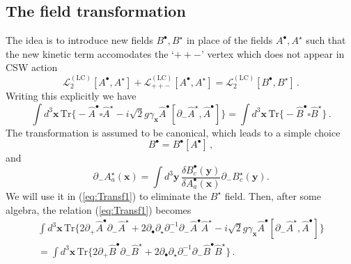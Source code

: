 \documentclass[english,american]{article}
\begin{document}
\subsection{The field transformation}

The idea is to introduce new fields $B^{\bullet},B^{\star}$ in place
of the fields $A^{\bullet},A^{\star}$ such that the new kinetic term accomodates the `$++-$' vertex which does not appear in CSW action \citep{Mansfield2006}
\begin{equation}
\mathcal{L}_{2}^{\left(\mathrm{LC}\right)}\left[A^{\bullet},A^{\star}\right]+\mathcal{L}_{++-}^{\left(\mathrm{LC}\right)}\left[A^{\bullet},A^{\star}\right]=\mathcal{L}_{2}^{\left(\mathrm{LC}\right)}\left[B^{\bullet},B^{\star}\right]\,.
\end{equation}
Writing this explicitly we have
\begin{equation}
\int d^{3}\mathbf{x}\,\mathrm{Tr}\Bigg\{-\hat{A}^{\bullet}\square\hat{A}^{\star}-i\sqrt{2}g\gamma_{\mathbf{x}}\hat{A}^{\bullet}\left[\partial_{-}\hat{A}^{\star},\hat{A}^{\bullet}\right]\Bigg\}=\int d^{3}\mathbf{x}\,\mathrm{Tr}\Bigg\{-\hat{B}^{\bullet}\square\hat{B}^{\star}\Bigg\}\,.\label{eq:Transf1}
\end{equation}
The transformation is assumed to be canonical, which leads to a simple
choice
\begin{equation}
B^{\bullet}=B^{\bullet}\left[A^{\bullet}\right]\,,
\end{equation}
and
\begin{equation}
\partial_{-}A_{a}^{\star}\left(\mathbf{x}\right)=\int d^{3}\mathbf{y}\,\frac{\delta B_{c}^{\bullet}\left(\mathbf{y}\right)}{\delta A_{a}^{\bullet}\left(\mathbf{x}\right)}\partial_{-}B_{c}^{\star}\left(\mathbf{y}\right).\label{eq:Bmindef-2-1}
\end{equation}
We will use it in (\ref{eq:Transf1}) to eliminate the $B^{\star}$
field. Then,  after some algebra, the relation (\ref{eq:Transf1})  becomes
\begin{multline}
\int d^{3}\mathbf{x}\,\mathrm{Tr}\Bigg\{2\partial_{+}\hat{A}^{\bullet}\partial_{-}\hat{A}^{\star}+2\partial_{\bullet}\partial_{\star}\partial_{-}^{-1}\partial_{-}\hat{A}^{\bullet}\hat{A}^{\star}-i\sqrt{2}g\gamma_{\mathbf{x}}\hat{A}^{\bullet}\left[\partial_{-}\hat{A}^{\star},\hat{A}^{\bullet}\right]\Bigg\}\\
=\int d^{3}\mathbf{x}\,\mathrm{Tr}\Bigg\{2\partial_{+}\hat{B}^{\bullet}\partial_{-}\hat{B}^{\star}+2\partial_{\bullet}\partial_{\star}\partial_{-}^{-1}\partial_{-}\hat{B}^{\bullet}\hat{B}^{\star}\Bigg\}\,.
\end{multline}
\end{document}
